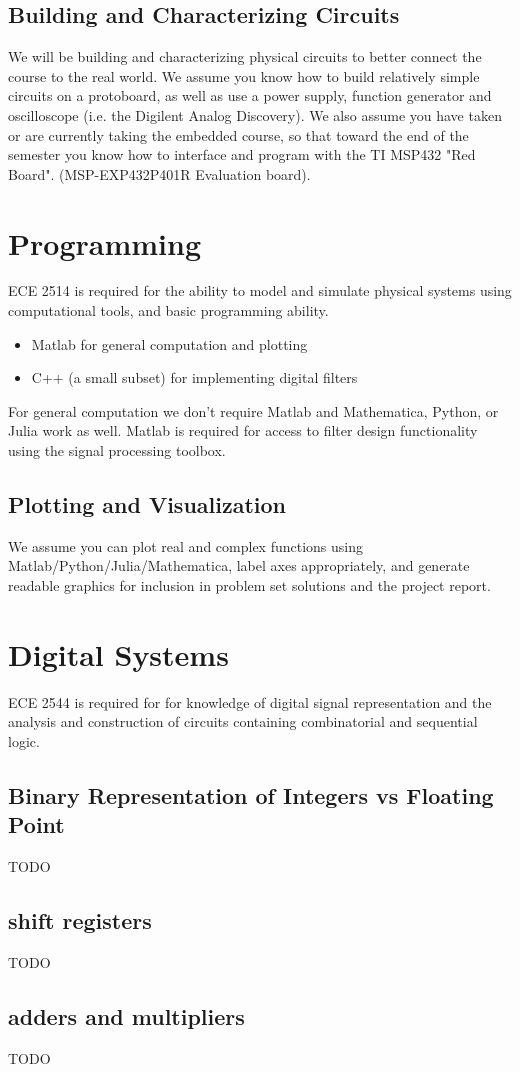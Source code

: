 \subsection*{Building and Characterizing Circuits}

We will be building and characterizing physical circuits to better connect the course to the real world. We assume you know how to build relatively simple circuits on a protoboard, as well as use a power supply, function generator and oscilloscope (i.e. the Digilent Analog Discovery). We also assume you have taken or are currently taking the embedded course, so that toward the end of the semester you know how to interface and program with the TI MSP432 "Red Board".
(MSP-EXP432P401R Evaluation board).

\section{Programming}

ECE 2514 is required for the ability to model and simulate physical systems using computational tools, and basic programming ability.

\begin{itemize}
\item Matlab for general computation and plotting
\item C++ (a small subset) for implementing digital filters
\end{itemize}

For general computation we don't require Matlab and Mathematica, Python, or Julia work as well. Matlab is required for access to filter design functionality using the signal processing toolbox. 

\subsection*{Plotting and Visualization}

We assume you can plot real and complex functions using Matlab/Python/Julia/Mathematica, label axes appropriately, and generate readable graphics for inclusion in problem set solutions and the project report.

\section{Digital Systems}

ECE 2544 is required for for knowledge of digital signal representation and the analysis and construction of circuits containing combinatorial and sequential logic.

\subsection*{Binary Representation of Integers vs Floating Point}

TODO

\subsection*{shift registers}

TODO

\subsection*{adders and multipliers}

TODO
